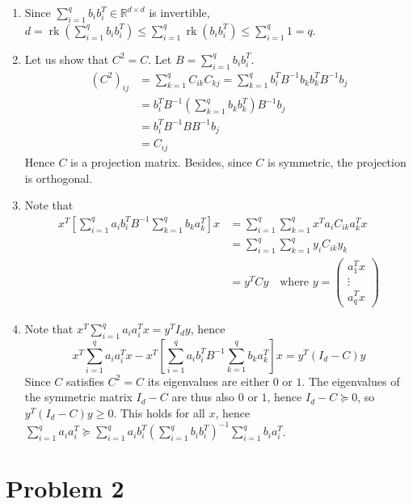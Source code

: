 \documentclass[a4paper,11pt]{article}
\DeclareMathOperator*{\rk}{rk}
\begin{document}
\begin{enumerate}
  \item Since $\sum_{i=1}^q b_i b_i^T\in \mathbb R^{d\times d}$ is invertible, $d=\rk\left(\sum_{i=1}^q b_i b_i^T\right) \leq \sum_{i=1}^q \rk(b_i b_i^T) \leq \sum_{i=1}^q 1 = q$.

  \item Let us show that $C^2=C$. Let $B =\sum_{i=1}^q b_i b_i^T$. 
  $$\begin{aligned}(C^2)_{ij} &= \sum_{k=1}^q C_{ik} C_{kj}
  = \sum_{k=1}^q b_i^T B^{-1} b_k b_k^T B^{-1} b_j\\
  &=  b_i^T B^{-1} \left(\sum_{k=1}^q b_k b_k^T\right) B^{-1} b_j \\
  &= b_i^T B^{-1} B B^{-1} b_j\\
  &= C_{ij}
  \end{aligned}
  $$
  Hence $C$ is a projection matrix. Besides, since $C$ is symmetric, the projection is orthogonal.

  \item Note that $$\begin{aligned}
  x^T\left[\sum_{i=1}^q a_i b_i^T B^{-1} \sum_{k=1}^q b_k a_k^T\right]x &= \sum_{i=1}^q \sum_{k=1}^q x^Ta_i C_{ik} a_k^Tx\\
  &= \sum_{i=1}^q \sum_{k=1}^q y_i C_{ik} y_k\\
  &= y^T C y \quad \text{where } y=\begin{pmatrix}
    a_1^Tx \\ \vdots \\ a_q^Tx
  \end{pmatrix} 
  \end{aligned}
  $$

  \item Note that $x^T \sum_{i=1}^q a_i a_i^T x = y^T I_d y$, hence $$x^T \sum_{i=1}^q a_i a_i^T x - x^T\left[\sum_{i=1}^q a_i b_i^T B^{-1} \sum_{k=1}^q b_k a_k^T\right]x = y^T(I_d-C)y$$
  Since $C$ satisfies $C^2=C$ its eigenvalues are either $0$ or $1$. The eigenvalues of the symmetric matrix $I_d-C$ are thus also $0$ or $1$, hence $I_d-C\succeq 0$, so $y^T(I_d-C)y \geq 0$. This holds for all $x$, hence 
  $\sum_{i=1}^q a_i a_i^T \succeq \sum_{i=1}^q a_i b_i^T \left(\sum_{i=1}^q b_i b_i^T\right)^{-1} \sum_{i=1}^q b_i a_i^T$.
\end{enumerate}



\section*{Problem 2}
\end{document}

